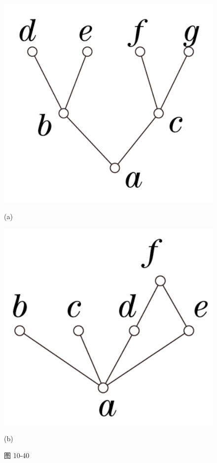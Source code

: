 \documentclass[UTF8]{ctexart}
\begin{document}
    \begin{figure}[!htb]
        \centering
        \begin{minipage}[t]{0.241\textwidth}
        \centering
        \includegraphics[width=1\textwidth]{10-40-a.png}
        \caption*{(a)}
        \end{minipage}
        \begin{minipage}[t]{0.230\textwidth}
        \centering
        \includegraphics[width=1\textwidth]{10-40-b.png}
        \caption*{(b)}
        \end{minipage}
        \caption*{图 10-40}
    \end{figure}
\end{document}
